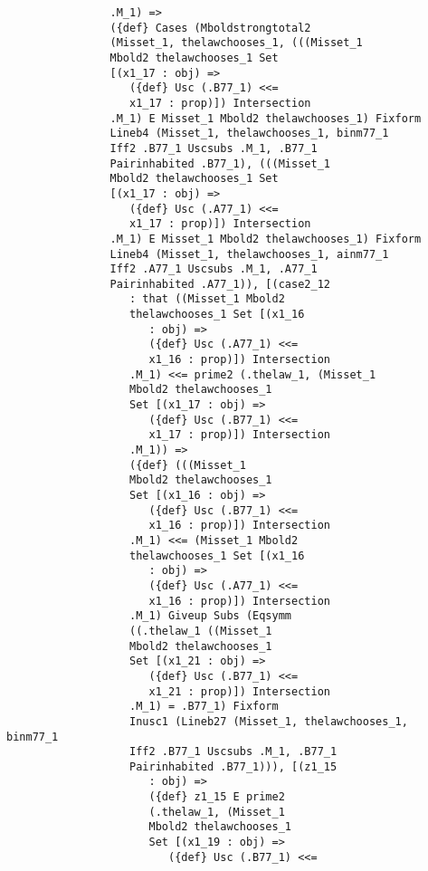 \documentclass[12pt]{article}
\begin{document}
\begin{verbatim}
                .M_1) => 
                ({def} Cases (Mboldstrongtotal2 
                (Misset_1, thelawchooses_1, (((Misset_1 
                Mbold2 thelawchooses_1 Set 
                [(x1_17 : obj) => 
                   ({def} Usc (.B77_1) <<= 
                   x1_17 : prop)]) Intersection 
                .M_1) E Misset_1 Mbold2 thelawchooses_1) Fixform 
                Lineb4 (Misset_1, thelawchooses_1, binm77_1 
                Iff2 .B77_1 Uscsubs .M_1, .B77_1 
                Pairinhabited .B77_1), (((Misset_1 
                Mbold2 thelawchooses_1 Set 
                [(x1_17 : obj) => 
                   ({def} Usc (.A77_1) <<= 
                   x1_17 : prop)]) Intersection 
                .M_1) E Misset_1 Mbold2 thelawchooses_1) Fixform 
                Lineb4 (Misset_1, thelawchooses_1, ainm77_1 
                Iff2 .A77_1 Uscsubs .M_1, .A77_1 
                Pairinhabited .A77_1)), [(case2_12 
                   : that ((Misset_1 Mbold2 
                   thelawchooses_1 Set [(x1_16 
                      : obj) => 
                      ({def} Usc (.A77_1) <<= 
                      x1_16 : prop)]) Intersection 
                   .M_1) <<= prime2 (.thelaw_1, (Misset_1 
                   Mbold2 thelawchooses_1 
                   Set [(x1_17 : obj) => 
                      ({def} Usc (.B77_1) <<= 
                      x1_17 : prop)]) Intersection 
                   .M_1)) => 
                   ({def} (((Misset_1 
                   Mbold2 thelawchooses_1 
                   Set [(x1_16 : obj) => 
                      ({def} Usc (.B77_1) <<= 
                      x1_16 : prop)]) Intersection 
                   .M_1) <<= (Misset_1 Mbold2 
                   thelawchooses_1 Set [(x1_16 
                      : obj) => 
                      ({def} Usc (.A77_1) <<= 
                      x1_16 : prop)]) Intersection 
                   .M_1) Giveup Subs (Eqsymm 
                   ((.thelaw_1 ((Misset_1 
                   Mbold2 thelawchooses_1 
                   Set [(x1_21 : obj) => 
                      ({def} Usc (.B77_1) <<= 
                      x1_21 : prop)]) Intersection 
                   .M_1) = .B77_1) Fixform 
                   Inusc1 (Lineb27 (Misset_1, thelawchooses_1, binm77_1 
                   Iff2 .B77_1 Uscsubs .M_1, .B77_1 
                   Pairinhabited .B77_1))), [(z1_15 
                      : obj) => 
                      ({def} z1_15 E prime2 
                      (.thelaw_1, (Misset_1 
                      Mbold2 thelawchooses_1 
                      Set [(x1_19 : obj) => 
                         ({def} Usc (.B77_1) <<= 

\end{verbatim}
\end{document}
